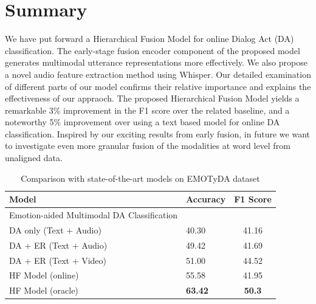 \section{Summary}

We have put forward a Hierarchical Fusion Model for online Dialog Act (DA) classification. The early-stage fusion encoder component of the proposed model generates multimodal utterance representations more effectively.  We also propose a novel audio feature extraction method using Whisper. Our detailed examination of different parts of our model confirms their relative importance and explains the effectiveness of our appraoch. The proposed Hierarchical Fusion Model yields a remarkable 3\% improvement in the F1 score over the related baseline, and a noteworthy 5\% improvement over using a text based model for online DA classification. Inspired by our exciting results from early fusion, in future we want to investigate even more granular fusion of the modalities at word level from unaligned data.


\begin{table}
  \centering
  \small
  \begin{tabularx}{\linewidth}{Xlc}
    \toprule
    Model & Accuracy & F1 Score \\
    \midrule
    Emotion-aided Multimodal DA Classification \cite{saha-etal-2020-towards} & ~ & ~ \\
    DA only (Text + Audio) & 40.30 & 41.16 \\
    DA + ER (Text + Audio) & 49.42 & 41.69  \\
    DA + ER (Text + Video) & 51.00 & 44.52 \\
    \hline
    HF Model (online) & 55.58 & 41.95 \\
    HF Model (oracle) & \textbf{63.42} & \textbf{50.3} \\
    \bottomrule
  \end{tabularx}
  \caption{Comparison with state-of-the-art models on EMOTyDA dataset}
  \label{tab:emotyda}
\end{table}




